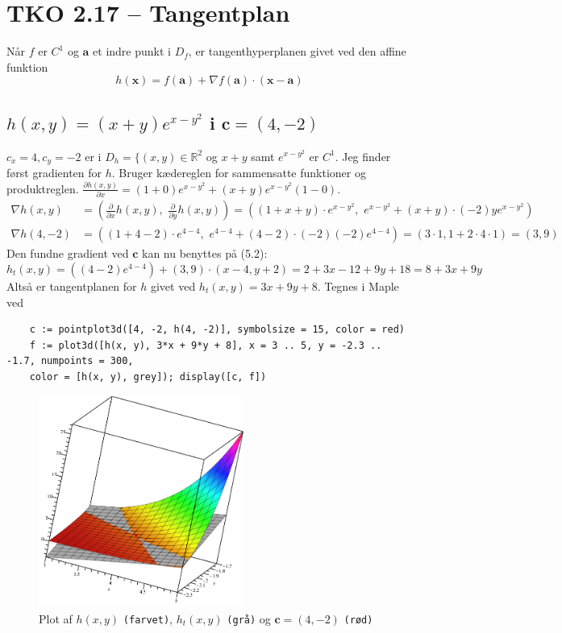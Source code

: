 \documentclass{report}
\begin{document}
\newpage\section{TKO 2.17 -- Tangentplan}
Når $f$ er $C^1$ og $\mathbf{a}$ et indre punkt i $D_f$, er tangenthyperplanen givet ved den affine funktion\begin{equation}
    h(\mathbf{x})=f(\mathbf{a})+\nabla f(\mathbf{a})\cdot(\mathbf{x}-\mathbf{a})
\end{equation}
\setcounter{subsection}{2}
\subsection{$h(x,y)=(x+y)e^{x-y^2}$ i $\mathbf{c}=(4,-2)$}
$c_x=4,c_y=-2$ er i $D_h=\{(x,y)\in\mathbb{R}^2$ og $x+y$ samt $e^{x-y^2}$ er $C^1$. Jeg finder først gradienten for $h$. Bruger kædereglen for sammensatte funktioner og produktreglen. $\frac{\partial h(x,y)}{\partial x}=(1+0)e^{x-y^2}+(x+y)e^{x-y^2}(1-0)$.
\begin{align*}
    \nabla h(x,y)&=\left(\frac{\partial}{\partial x}h(x,y),\,\, \frac{\partial}{\partial y}h(x,y)\right)=\left((1+x+y)\cdot e^{x-y^2},\,\,e^{x-y^2}+(x+y)\cdot (-2)ye^{x-y^2}\right)\\
    \nabla h(4,-2)&=\left((1+4-2)\cdot e^{4-4},\,\, e^{4-4}+(4-2)\cdot(-2)(-2)e^{4-4}\right)=(3\cdot1, 1+2\cdot4\cdot1)=(3,9)
\end{align*}
Den fundne gradient ved $\mathbf{c}$ kan nu benyttes på (5.2):
\begin{equation}
    h_t(x,y)=\left((4-2)e^{4-4}\right)+(3,9)\cdot(x-4,y+2)=2+3x-12+9y+18=8+3x+9y
\end{equation}
Altså er tangentplanen for $h$ givet ved $h_t(x,y)=3x+9y+8$. Tegnes i Maple ved\begin{verbatim}
    c := pointplot3d([4, -2, h(4, -2)], symbolsize = 15, color = red)
    f := plot3d([h(x, y), 3*x + 9*y + 8], x = 3 .. 5, y = -2.3 .. -1.7, numpoints = 300, 
    color = [h(x, y), grey]); display([c, f])
\end{verbatim}
\begin{figure}[H]
    \centering
    \includegraphics[width=0.6\textwidth]{52c.png}
    \caption{Plot af $h(x,y)$ \texttt{(farvet)}, $h_t(x,y)$ \texttt{(grå)} og $\mathbf{c}=(4,-2)$ \texttt{(rød)}}
\end{figure}
\end{document}
